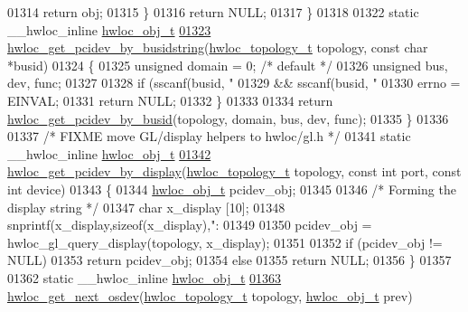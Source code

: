\begin{DoxyCode}
01314       \textcolor{keywordflow}{return} obj;
01315   \}
01316   \textcolor{keywordflow}{return} NULL;
01317 \}
01318 
01322 \textcolor{keyword}{static} \_\_hwloc\_inline \hyperlink{a00016}{hwloc_obj_t}
\hypertarget{a00031_source_l01323}{}\hyperlink{a00064_ga9d5643f2e337fe1b98e7cce5c1ecb74e}{01323} \hyperlink{a00064_ga9d5643f2e337fe1b98e7cce5c1ecb74e}{hwloc_get_pcidev_by_busidstring}(\hyperlink{a00039_ga9d1e76ee15a7dee158b786c30b6a6e38}{hwloc_topology_t} topology, \textcolor{keyword}{const} \textcolor{keywordtype}{char} *busid)
01324 \{
01325   \textcolor{keywordtype}{unsigned} domain = 0; \textcolor{comment}{/* default */}
01326   \textcolor{keywordtype}{unsigned} bus, dev, func;
01327 
01328   \textcolor{keywordflow}{if} (sscanf(busid, \textcolor{stringliteral}{"%
01329       && sscanf(busid, \textcolor{stringliteral}{"%
01330     errno = EINVAL;
01331     \textcolor{keywordflow}{return} NULL;
01332   \}
01333 
01334   \textcolor{keywordflow}{return} \hyperlink{a00064_ga546e1d690c63fb24177f3013ed78ceb1}{hwloc_get_pcidev_by_busid}(topology, domain, bus, dev, func);
01335 \}
01336 
01337 \textcolor{comment}{/* FIXME move GL/display helpers to hwloc/gl.h */}
01341 \textcolor{keyword}{static} \_\_hwloc\_inline \hyperlink{a00016}{hwloc_obj_t}
\hypertarget{a00031_source_l01342}{}\hyperlink{a00064_ga0c68e88104c986d19e21e5bc44c7abd4}{01342} \hyperlink{a00064_ga0c68e88104c986d19e21e5bc44c7abd4}{hwloc_get_pcidev_by_display}(\hyperlink{a00039_ga9d1e76ee15a7dee158b786c30b6a6e38}{hwloc_topology_t} topology, \textcolor{keyword}{const} \textcolor{keywordtype}{int} port, \textcolor{keyword}{const} \textcolor{keywordtype}{int} 
      device)
01343 \{
01344   \hyperlink{a00016}{hwloc_obj_t} pcidev\_obj;
01345 
01346   \textcolor{comment}{/* Forming the display string */}
01347   \textcolor{keywordtype}{char} x\_display [10];
01348   snprintf(x\_display,\textcolor{keyword}{sizeof}(x\_display),\textcolor{stringliteral}{":%
01349 
01350   pcidev\_obj = hwloc\_gl\_query\_display(topology, x\_display);
01351 
01352   \textcolor{keywordflow}{if} (pcidev\_obj != NULL)
01353     \textcolor{keywordflow}{return} pcidev\_obj;
01354   \textcolor{keywordflow}{else}
01355     \textcolor{keywordflow}{return} NULL;
01356 \}
01357 
01362 \textcolor{keyword}{static} \_\_hwloc\_inline \hyperlink{a00016}{hwloc_obj_t}
\hypertarget{a00031_source_l01363}{}\hyperlink{a00064_ga73a5bc6265642e6001f7a10812ab886d}{01363} \hyperlink{a00064_ga73a5bc6265642e6001f7a10812ab886d}{hwloc_get_next_osdev}(\hyperlink{a00039_ga9d1e76ee15a7dee158b786c30b6a6e38}{hwloc_topology_t} topology, \hyperlink{a00016}{hwloc_obj_t} prev)
}}}
\end{DoxyCode}
